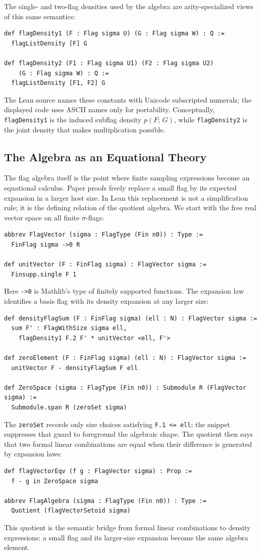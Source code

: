 \documentclass{article}
\newcommand{\den}[2]{p(#1;\,#2)}
\newcommand{\lean}[1]{\texttt{#1}}
\begin{document}
The single- and two-flag densities used by the algebra are arity-specialized
views of this same semantics:
\begin{lstlisting}
def flagDensity1 (F : Flag sigma U) (G : Flag sigma W) : Q :=
  flagListDensity [F] G

def flagDensity2 (F1 : Flag sigma U1) (F2 : Flag sigma U2)
    (G : Flag sigma W) : Q :=
  flagListDensity [F1, F2] G
\end{lstlisting}
The Lean source names these constants with Unicode subscripted numerals; the
displayed code uses ASCII names only for portability.  Conceptually,
\lean{flagDensity1} is the induced
subflag density $\den{F}{G}$, while \lean{flagDensity2} is the joint density
that makes multiplication possible.

\subsection{The Algebra as an Equational Theory}

The flag algebra itself is the point where finite sampling expressions become
an equational calculus.  Paper proofs freely replace a small flag by its
expected expansion in a larger host size.  In Lean this replacement is not a
simplification rule; it is the defining relation of the quotient algebra.  We
start with the free real vector space on all finite $\sigma$-flags:
\begin{lstlisting}
abbrev FlagVector (sigma : FlagType (Fin n0)) : Type :=
  FinFlag sigma ->0 R

def unitVector (F : FinFlag sigma) : FlagVector sigma :=
  Finsupp.single F 1
\end{lstlisting}
Here \lean{->0} is Mathlib's type of finitely supported functions.  The
expansion law identifies a basis flag with its density expansion at any larger
size:
\begin{lstlisting}
def densityFlagSum (F : FinFlag sigma) (ell : N) : FlagVector sigma :=
  sum F' : FlagWithSize sigma ell,
    flagDensity1 F.2 F' * unitVector <ell, F'>

def zeroElement (F : FinFlag sigma) (ell : N) : FlagVector sigma :=
  unitVector F - densityFlagSum F ell

def ZeroSpace (sigma : FlagType (Fin n0)) : Submodule R (FlagVector sigma) :=
  Submodule.span R (zeroSet sigma)
\end{lstlisting}
The \lean{zeroSet} records only size choices satisfying \lean{F.1 <= ell}; the
snippet suppresses that guard to foreground the algebraic shape.  The quotient
then says that two formal linear combinations are equal when their difference
is generated by expansion laws:
\begin{lstlisting}
def flagVectorEqv (f g : FlagVector sigma) : Prop :=
  f - g in ZeroSpace sigma

abbrev FlagAlgebra (sigma : FlagType (Fin n0)) : Type :=
  Quotient (flagVectorSetoid sigma)
\end{lstlisting}
This quotient is the semantic bridge from formal linear combinations to
density expressions: a small flag and its larger-size expansion become the
same algebra element.
\end{document}
